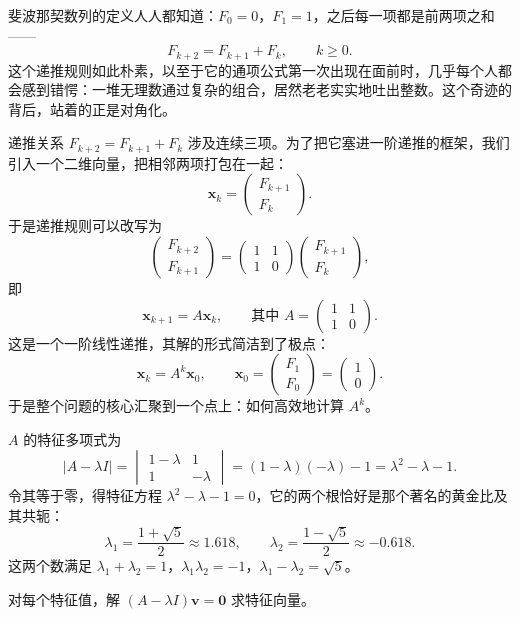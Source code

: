 \documentclass[UTF8]{ctexbook}
\begin{document}
斐波那契数列的定义人人都知道：$F_0=0$，$F_1=1$，之后每一项都是前两项之和——
\[
F_{k+2}=F_{k+1}+F_k,\qquad k\geq0.
\]
这个递推规则如此朴素，以至于它的通项公式第一次出现在面前时，几乎每个人都会感到错愕：一堆无理数通过复杂的组合，居然老老实实地吐出整数。这个奇迹的背后，站着的正是对角化。



递推关系 $F_{k+2}=F_{k+1}+F_k$ 涉及连续三项。为了把它塞进一阶递推的框架，我们引入一个二维向量，把相邻两项打包在一起：
\[
\mathbf{x}_k=\begin{pmatrix}F_{k+1}\\F_k\end{pmatrix}.
\]
于是递推规则可以改写为
\[
\begin{pmatrix}F_{k+2}\\F_{k+1}\end{pmatrix}
=\begin{pmatrix}1&1\\1&0\end{pmatrix}
\begin{pmatrix}F_{k+1}\\F_k\end{pmatrix},
\]
即
\[
\mathbf{x}_{k+1}=A\mathbf{x}_k,\qquad\text{其中 }A=\begin{pmatrix}1&1\\1&0\end{pmatrix}.
\]
这是一个一阶线性递推，其解的形式简洁到了极点：
\[
\mathbf{x}_k=A^k\mathbf{x}_0,\qquad \mathbf{x}_0=\begin{pmatrix}F_1\\F_0\end{pmatrix}=\begin{pmatrix}1\\0\end{pmatrix}.
\]
于是整个问题的核心汇聚到一个点上：如何高效地计算 $A^k$。



$A$ 的特征多项式为
\[
|A-\lambda I|=\begin{vmatrix}1-\lambda&1\\1&-\lambda\end{vmatrix}
=(1-\lambda)(-\lambda)-1=\lambda^2-\lambda-1.
\]
令其等于零，得特征方程 $\lambda^2-\lambda-1=0$，它的两个根恰好是那个著名的黄金比及其共轭：
\[
\lambda_1=\frac{1+\sqrt{5}}{2}\approx1.618,\qquad
\lambda_2=\frac{1-\sqrt{5}}{2}\approx-0.618.
\]
这两个数满足 $\lambda_1+\lambda_2=1$，$\lambda_1\lambda_2=-1$，$\lambda_1-\lambda_2=\sqrt{5}$。

对每个特征值，解 $(A-\lambda I)\mathbf{v}=\mathbf{0}$ 求特征向量。
\end{document}
